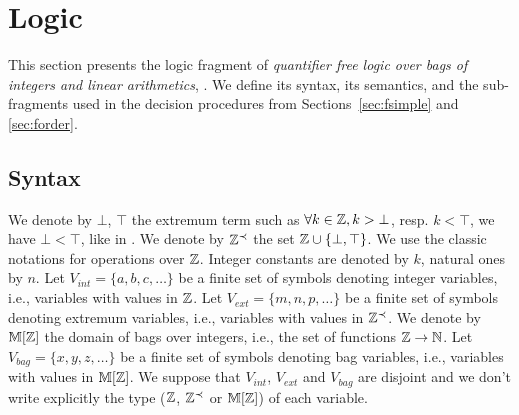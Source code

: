 
\section{Logic \QFBILIA}
\label{sec:logic}

This section presents the logic fragment of \emph{quantifier free logic over bags of integers and linear arithmetics}, \QFBILIA.
We define its syntax, its semantics, and the sub-fragments used in the decision procedures from Sections~\ref{sec:fsimple} and \ref{sec:forder}.

\subsection{Syntax}
\label{ssec:syn}

We denote by $\bot$, $\top$ the extremum term such as $\forall k \in \mathbb{Z}, k > \bot$, resp. $k < \top$, we have $\bot < \top$, like in \cite{piskac2010decision}.
We denote by $\mathbb{Z}^{\prec}$ the set $\mathbb{Z} \cup \{\bot,\top\}$.
We use the classic notations for operations over $\mathbb{Z}$.
Integer constants are denoted by $k$, natural ones by $n$.
Let $V_{int}=\{a,b,c,\ldots\}$ be a finite set of symbols denoting integer variables, i.e., variables with values in $\mathbb{Z}$.
Let $V_{ext}=\{m,n,p,\ldots\}$ be a finite set of symbols denoting extremum variables, i.e., variables with values in $\mathbb{Z}^{\prec}$.
We denote by $\mathbb{M}[\mathbb{Z}]$ the domain of bags over integers, i.e.,
the set of functions $\mathbb{Z}\rightarrow\mathbb{N}$.
Let $V_{bag}=\{x,y,z,\ldots\}$ be a finite set of symbols denoting bag variables, i.e., variables with values in $\mathbb{M}[\mathbb{Z}]$.
We suppose that $V_{int}$, $V_{ext}$ and $V_{bag}$ are disjoint and we don't write explicitly the type ($\mathbb{Z}$, $\mathbb{Z}^{\prec}$ or $\mathbb{M}[\mathbb{Z}]$) of each variable.


